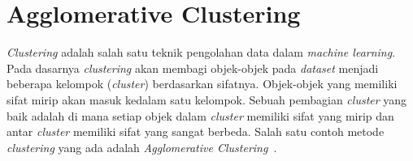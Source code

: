 %
%
%

\section{Agglomerative Clustering}
\label{sec:clustering}
\textit{Clustering} adalah salah satu teknik pengolahan data dalam \textit{machine learning}. Pada dasarnya \textit{clustering} akan membagi objek-objek pada \textit{dataset}  menjadi beberapa kelompok (\textit{cluster}) berdasarkan sifatnya. Objek-objek yang memiliki sifat mirip akan masuk kedalam satu kelompok. Sebuah pembagian \textit{cluster} yang baik adalah di mana setiap objek dalam \textit{cluster} memiliki sifat yang mirip dan antar \textit{cluster} memiliki sifat yang sangat berbeda. Salah satu contoh metode \textit{clustering} yang ada adalah \textit{Agglomerative Clustering}~\cite{han2011data}. 

